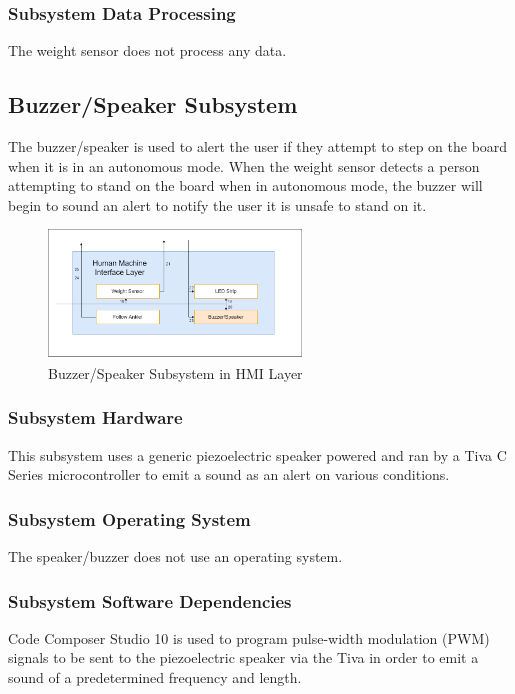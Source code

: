 \subsubsection{Subsystem Data Processing}
The weight sensor does not process any data.

\subsection{Buzzer/Speaker Subsystem}
The buzzer/speaker is used to alert the user if they attempt to step on the board when it is in an autonomous mode. When the weight sensor detects a person attempting to stand on the board when in autonomous mode, the buzzer will begin to sound an alert to notify the user it is unsafe to stand on it.

\begin{figure}[h!]
	\centering
 	\includegraphics[width=0.60\textwidth]{images/Kendall/Buzzer.png}
 \caption{Buzzer/Speaker Subsystem in HMI Layer}
\end{figure}

\subsubsection{Subsystem Hardware}
This subsystem uses a generic piezoelectric speaker powered and ran by a Tiva C Series microcontroller to emit a sound as an alert on various conditions.

\subsubsection{Subsystem Operating System}
The speaker/buzzer does not use an operating system.

\subsubsection{Subsystem Software Dependencies}
Code Composer Studio 10 is used to program pulse-width modulation (PWM) signals to be sent to the piezoelectric speaker via the Tiva in order to emit a sound of a predetermined frequency and length.

